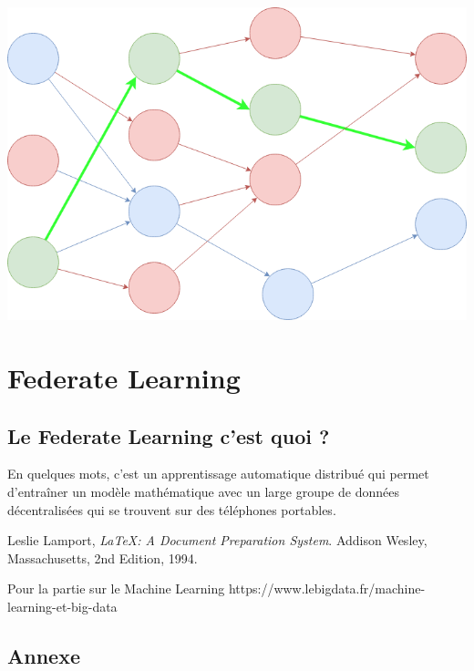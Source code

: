 \documentclass[12pt,a4paper]{report}
\begin{document}
\begin{center}
	\includegraphics[scale=0.4]{deep_learning_schema}
	\label{fig1}
\end{center}

\chapter{Federate Learning}
\section{Le Federate Learning c'est quoi ?}

En quelques mots, c'est un apprentissage automatique distribué qui permet d'entraîner un modèle mathématique avec un large groupe de données décentralisées qui se trouvent sur des téléphones portables.



\begin{thebibliography}{9}

	  Leslie Lamport,
	  \emph{\LaTeX: A Document Preparation System}.
	  Addison Wesley, Massachusetts,
	  2nd Edition,
	  1994.
	  
	Pour la partie sur le Machine Learning https://www.lebigdata.fr/machine-learning-et-big-data

\end{thebibliography}


\label{Pour la partie sur le Machine Learning https://www.lebigdata.fr/machine-learning-et-big-data}


\label{https://www.youtube.com/watch?v=QR1SnCRungE&ab_channel=AlainOlivetti} 


\begin{appendix}
 \chapter{Annexe}
 
\end{appendix}
\end{document}
